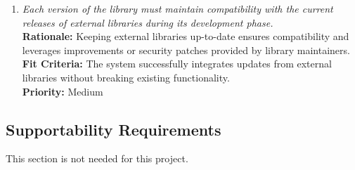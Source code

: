 \documentclass[12pt]{article}
\begin{document}
\begin{enumerate}[label=MS-MNT \arabic*., wide=0pt, leftmargin=*]
  \item \emph{Each version of the library must maintain compatibility
      with the current releases of external libraries during its
    development phase.}\\
    {\bf Rationale:} Keeping external libraries up-to-date ensures
    compatibility and leverages improvements or security patches
    provided by library maintainers.\\
    {\bf Fit Criteria:} The system successfully integrates updates
    from external libraries without breaking existing functionality.\\
    {\bf Priority:} Medium

\end{enumerate}

\subsection{Supportability Requirements}
This section is not needed for this project.
\end{document}
